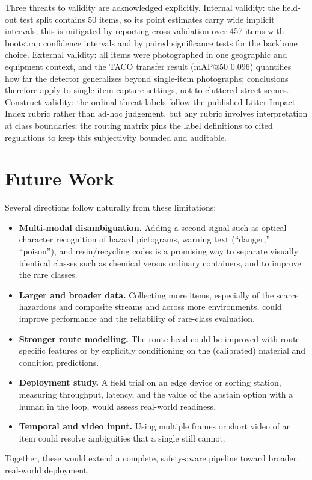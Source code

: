 Three threats to validity are acknowledged explicitly. Internal validity: the held-out test split contains 50 items, so its point estimates carry wide implicit intervals; this is mitigated by reporting cross-validation over 457 items with bootstrap confidence intervals and by paired significance tests for the backbone choice. External validity: all items were photographed in one geographic and equipment context, and the TACO transfer result (mAP@50 0.096) quantifies how far the detector generalizes beyond single-item photographs; conclusions therefore apply to single-item capture settings, not to cluttered street scenes. Construct validity: the ordinal threat labels follow the published Litter Impact Index rubric rather than ad-hoc judgement, but any rubric involves interpretation at class boundaries; the routing matrix pins the label definitions to cited regulations to keep this subjectivity bounded and auditable.

\section{Future Work}
Several directions follow naturally from these limitations:
\begin{itemize}
    \item \textbf{Multi-modal disambiguation.} Adding a second signal such as optical character recognition of hazard pictograms, warning text (``danger,'' ``poison''), and resin/recycling codes is a promising way to separate visually identical classes such as chemical versus ordinary containers, and to improve the rare classes.
    \item \textbf{Larger and broader data.} Collecting more items, especially of the scarce hazardous and composite streams and across more environments, could improve performance and the reliability of rare-class evaluation.
    \item \textbf{Stronger route modelling.} The route head could be improved with route-specific features or by explicitly conditioning on the (calibrated) material and condition predictions.
    \item \textbf{Deployment study.} A field trial on an edge device or sorting station, measuring throughput, latency, and the value of the abstain option with a human in the loop, would assess real-world readiness.
    \item \textbf{Temporal and video input.} Using multiple frames or short video of an item could resolve ambiguities that a single still cannot.
\end{itemize}
Together, these would extend a complete, safety-aware pipeline toward broader, real-world deployment.
